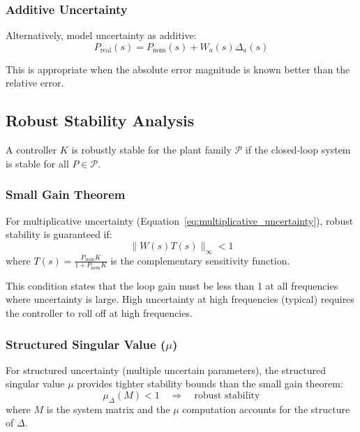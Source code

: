 \subsubsection{Additive Uncertainty}

Alternatively, model uncertainty as additive:
\begin{equation}
P_{\text{real}}(s) = P_{\text{nom}}(s) + W_a(s)\Delta_a(s)
\end{equation}

This is appropriate when the absolute error magnitude is known better than the relative error.

\subsection{Robust Stability Analysis}

A controller $K$ is robustly stable for the plant family $\mathcal{P}$ if the closed-loop system is stable for all $P \in \mathcal{P}$.

\subsubsection{Small Gain Theorem}

For multiplicative uncertainty (Equation~\ref{eq:multiplicative_uncertainty}), robust stability is guaranteed if:
\begin{equation}
\|W(s)T(s)\|_\infty < 1
\label{eq:robust_stability_condition}
\end{equation}
where $T(s) = \frac{P_{\text{nom}}K}{1 + P_{\text{nom}}K}$ is the complementary sensitivity function.

This condition states that the loop gain must be less than 1 at all frequencies where uncertainty is large. High uncertainty at high frequencies (typical) requires the controller to roll off at high frequencies.

\subsubsection{Structured Singular Value ($\mu$)}

For structured uncertainty (multiple uncertain parameters), the structured singular value $\mu$ provides tighter stability bounds than the small gain theorem:
\begin{equation}
\mu_\Delta(M) < 1 \quad \Rightarrow \quad \text{robust stability}
\end{equation}
where $M$ is the system matrix and the $\mu$ computation accounts for the structure of $\Delta$.

